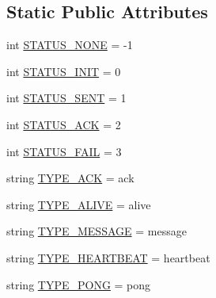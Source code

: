 \subsection*{Static Public Attributes}
\begin{DoxyCompactItemize}
\item 
int \hyperlink{classparlai_1_1mturk_1_1core_1_1legacy__2018_1_1socket__manager_1_1Packet_af7bd0185eeaa857a9f172ab2cba2b762}{S\+T\+A\+T\+U\+S\+\_\+\+N\+O\+NE} = -\/1
\item 
int \hyperlink{classparlai_1_1mturk_1_1core_1_1legacy__2018_1_1socket__manager_1_1Packet_a753404a6b0a7b5ec0c953cf840897f41}{S\+T\+A\+T\+U\+S\+\_\+\+I\+N\+IT} = 0
\item 
int \hyperlink{classparlai_1_1mturk_1_1core_1_1legacy__2018_1_1socket__manager_1_1Packet_a36ecf152246af337cb4f57e7dbe19701}{S\+T\+A\+T\+U\+S\+\_\+\+S\+E\+NT} = 1
\item 
int \hyperlink{classparlai_1_1mturk_1_1core_1_1legacy__2018_1_1socket__manager_1_1Packet_a8630ab664f81e7c37fb32dbfef4f01c4}{S\+T\+A\+T\+U\+S\+\_\+\+A\+CK} = 2
\item 
int \hyperlink{classparlai_1_1mturk_1_1core_1_1legacy__2018_1_1socket__manager_1_1Packet_a185286215d2c42499d035b13bec2d65e}{S\+T\+A\+T\+U\+S\+\_\+\+F\+A\+IL} = 3
\item 
string \hyperlink{classparlai_1_1mturk_1_1core_1_1legacy__2018_1_1socket__manager_1_1Packet_a777b16c394115310bf314f217b21b2fc}{T\+Y\+P\+E\+\_\+\+A\+CK} = \textquotesingle{}ack\textquotesingle{}
\item 
string \hyperlink{classparlai_1_1mturk_1_1core_1_1legacy__2018_1_1socket__manager_1_1Packet_a7c89ac70e6233ad9321d1d0f492c1453}{T\+Y\+P\+E\+\_\+\+A\+L\+I\+VE} = \textquotesingle{}alive\textquotesingle{}
\item 
string \hyperlink{classparlai_1_1mturk_1_1core_1_1legacy__2018_1_1socket__manager_1_1Packet_ab7828cea6955d00954fbd8886bdec041}{T\+Y\+P\+E\+\_\+\+M\+E\+S\+S\+A\+GE} = \textquotesingle{}message\textquotesingle{}
\item 
string \hyperlink{classparlai_1_1mturk_1_1core_1_1legacy__2018_1_1socket__manager_1_1Packet_a831b7bc5ce622e5dba211a42fce99207}{T\+Y\+P\+E\+\_\+\+H\+E\+A\+R\+T\+B\+E\+AT} = \textquotesingle{}heartbeat\textquotesingle{}
\item 
string \hyperlink{classparlai_1_1mturk_1_1core_1_1legacy__2018_1_1socket__manager_1_1Packet_a8a85b0dc996694335fe0b7c40ccd96bf}{T\+Y\+P\+E\+\_\+\+P\+O\+NG} = \textquotesingle{}pong\textquotesingle{}
\end{DoxyCompactItemize}


